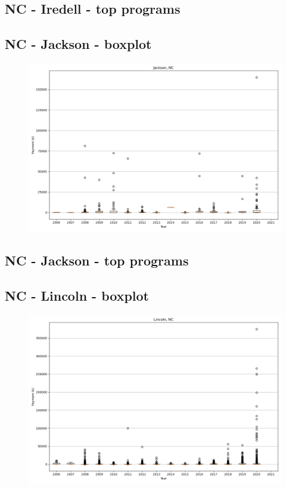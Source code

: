 \subsection*{NC - Iredell - top programs}

\newpage
\subsection*{NC - Jackson - boxplot}
\begin{figure}[h]
\centering
\includegraphics[width=7in]{../output/boxplots/counties/Jackson-NC_boxplot.png}
\end{figure}


\subsection*{NC - Jackson - top programs}

\newpage
\subsection*{NC - Lincoln - boxplot}
\begin{figure}[h]
\centering
\includegraphics[width=7in]{../output/boxplots/counties/Lincoln-NC_boxplot.png}
\end{figure}


